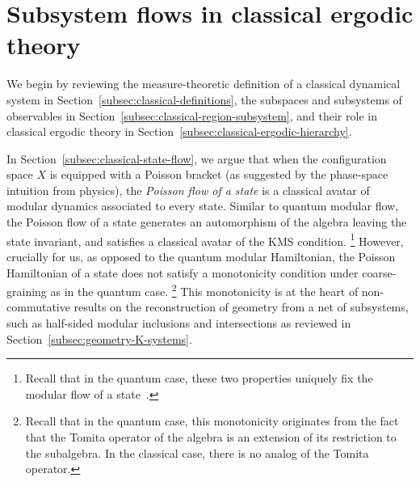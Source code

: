 \documentclass[a4paper,11pt]{article}
\theoremstyle{definition}
\theoremstyle{remark}
\begin{document}


\section{Subsystem flows in classical ergodic theory}%
\label{app:classical}
 
We begin by reviewing the measure-theoretic definition of a classical dynamical system
in Section~\ref{subsec:classical-definitions}, the subspaces and subsystems of
observables in Section~\ref{subsec:classical-region-subsystem}, and their role in
classical ergodic theory in Section~\ref{subsec:classical-ergodic-hierarchy}.
 
In Section~\ref{subsec:classical-state-flow}, we argue that when the configuration
space $X$ is equipped with a Poisson bracket (as suggested by the phase-space intuition
from physics), the \emph{Poisson flow of a state} is a classical avatar of modular
dynamics associated to every state.  Similar to quantum modular flow, the Poisson flow
of a state generates an automorphism of the algebra leaving the state invariant, and
satisfies a classical avatar of the KMS condition.%
\footnote{Recall that in the quantum case, these two properties uniquely fix the modular
  flow of a state~\cite{}.}
However, crucially for us, as opposed to the quantum modular Hamiltonian, the Poisson
Hamiltonian of a state does not satisfy a monotonicity condition under coarse-graining
as in the quantum case.%
\footnote{Recall that in the quantum case, this monotonicity originates from the fact
  that the Tomita operator of the algebra is an extension of its restriction to the
  subalgebra.  In the classical case, there is no analog of the Tomita operator.}
This monotonicity is at the heart of non-commutative results on the reconstruction of
geometry from a net of subsystems, such as half-sided modular inclusions and
intersections as reviewed in Section~\ref{subsec:geometry-K-systems}.
 
\end{document}
